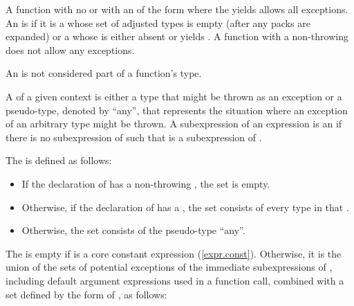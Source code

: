 \pnum
A function with no
or with an  of the form
\tcode{)} where
the  yields 
allows all exceptions.
An  is  if it is
a  whose
set of adjusted types is empty (after any packs are expanded)
or a  whose
 is either absent or
yields .
A function with a non-throwing
does not allow any exceptions.

\pnum
An
is not considered part of a function's type.

\pnum
A  of a given context is either a type that might be
thrown as an exception or a pseudo-type, denoted by “any”, that
represents the situation where an exception of an arbitrary type might
be thrown. A subexpression  of an expression  is an
 if there is no subexpression  of 
such that  is a subexpression of .

\pnum
The   is defined as follows:
\begin{itemize}
\item
If the declaration of  has a non-throwing
, the set is empty.
\item
Otherwise, if the declaration of  has a
, the set consists of
every type in that .
\item
Otherwise, the set consists of the pseudo-type “any”.
\end{itemize}

\pnum
The   is empty
if  is a core constant expression (\ref{expr.const}).
Otherwise, it is the union of the sets of potential exceptions of
the immediate subexpressions of ,
including default argument expressions used in a function call,
combined with a set  defined by the form of , as follows:

